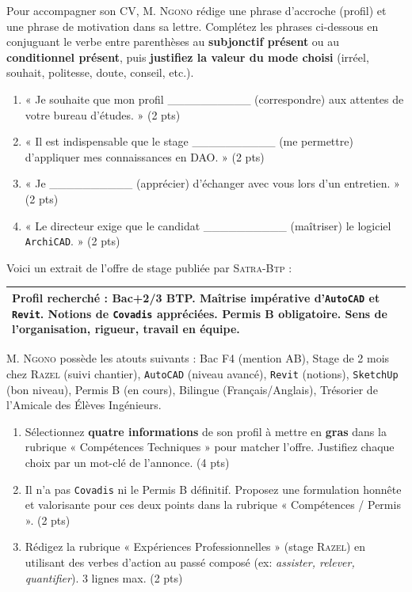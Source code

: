 \documentclass[11pt]{article}
\begin{document}
\begin{exercice}
Pour accompagner son CV, M. \textsc{Ngono} rédige une phrase d'accroche (profil) et une phrase de motivation dans sa lettre. Complétez les phrases ci-dessous en conjuguant le verbe entre parenthèses au \textbf{subjonctif présent} ou au \textbf{conditionnel présent}, puis \textbf{justifiez la valeur du mode choisi} (irréel, souhait, politesse, doute, conseil, etc.).
\begin{enumerate}
    \item « Je souhaite que mon profil \_\_\_\_\_\_\_\_\_\_ (correspondre) aux attentes de votre bureau d'études. » \hfill (2 pts)
    \item « Il est indispensable que le stage \_\_\_\_\_\_\_\_\_\_ (me permettre) d'appliquer mes connaissances en DAO. » \hfill (2 pts)
    \item « Je \_\_\_\_\_\_\_\_\_\_ (apprécier) d'échanger avec vous lors d'un entretien. » \hfill (2 pts)
    \item « Le directeur exige que le candidat \_\_\_\_\_\_\_\_\_\_ (maîtriser) le logiciel \texttt{ArchiCAD}. » \hfill (2 pts)
\end{enumerate}
\end{exercice}

\begin{exercice}
Voici un extrait de l'offre de stage publiée par \textsc{Satra-Btp} : 
\begin{center}
\begin{tabularx}{\linewidth}{|X|}
\hline
\textbf{Profil recherché :} Bac+2/3 BTP. Maîtrise impérative d'\texttt{AutoCAD} et \texttt{Revit}. Notions de \texttt{Covadis} appréciées. Permis B obligatoire. Sens de l'organisation, rigueur, travail en équipe. \\
\hline
\end{tabularx}
\end{center}
M. \textsc{Ngono} possède les atouts suivants : Bac F4 (mention AB), Stage de 2 mois chez \textsc{Razel} (suivi chantier), \texttt{AutoCAD} (niveau avancé), \texttt{Revit} (notions), \texttt{SketchUp} (bon niveau), Permis B (en cours), Bilingue (Français/Anglais), Trésorier de l'Amicale des Élèves Ingénieurs.
\begin{enumerate}
    \item Sélectionnez \textbf{quatre informations} de son profil à mettre en \textbf{gras} dans la rubrique « Compétences Techniques » pour matcher l'offre. Justifiez chaque choix par un mot-clé de l'annonce. \hfill (4 pts)
    \item Il n'a pas \texttt{Covadis} ni le Permis B définitif. Proposez une formulation honnête et valorisante pour ces deux points dans la rubrique « Compétences / Permis ». \hfill (2 pts)
    \item Rédigez la rubrique « Expériences Professionnelles » (stage \textsc{Razel}) en utilisant des verbes d'action au passé composé (ex: \textit{assister, relever, quantifier}). 3 lignes max. \hfill (2 pts)
\end{enumerate}
\end{exercice}
\end{document}
